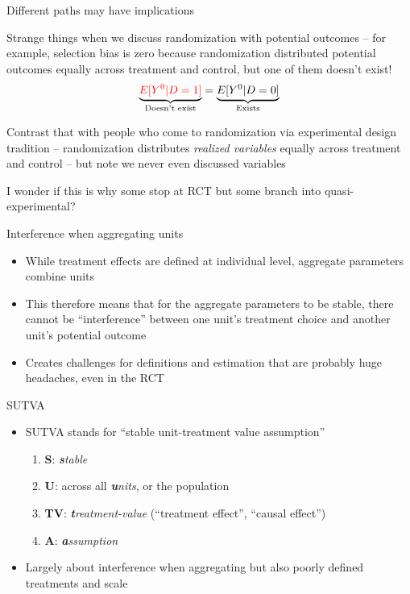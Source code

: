 \documentclass{beamer}
\begin{document}
\begin{frame}{Different paths may have implications}

Strange things when we discuss randomization with potential outcomes -- for example, selection bias is zero because randomization distributed potential outcomes equally across treatment and control, but one of them doesn't exist!  $$\underbrace{\textcolor{red}{E[Y^0|D=1]}}_{\mathclap{\text{Doesn't exist}}} = \underbrace{E[Y^0|D=0]}_{\mathclap{\text{Exists}}}$$

\bigskip

Contrast that with people who come to randomization via experimental design tradition -- randomization distributes \emph{realized variables} equally across treatment and control -- but note we never even discussed variables

\bigskip

I wonder if this is why some stop at RCT but some branch into quasi-experimental?

\end{frame}

\begin{frame}{Interference when aggregating units}

\begin{itemize}
\item While treatment effects are defined at individual level, aggregate parameters combine units
\item This therefore means that for the aggregate parameters to be stable, there cannot be ``interference'' between one unit's treatment choice and another unit's potential outcome
\item Creates challenges for definitions and estimation that are probably huge headaches, even in the RCT
\end{itemize}

\end{frame}

\begin{frame}{SUTVA}

  \begin{itemize}
    \item SUTVA stands for ``stable unit-treatment value assumption''
          \begin{enumerate}
            \item \textbf{S}: \emph{\textbf{s}table}
            \item \textbf{U}: across all \emph{\textbf{u}nits}, or the population
            \item \textbf{TV}: \emph{\textbf{t}reatment-value} (``treatment effect'', ``causal effect'')
            \item \textbf{A}: \emph{\textbf{a}ssumption}
          \end{enumerate}
    \item Largely about interference when aggregating but also poorly defined treatments and scale
  \end{itemize}
\end{frame}
\end{document}
